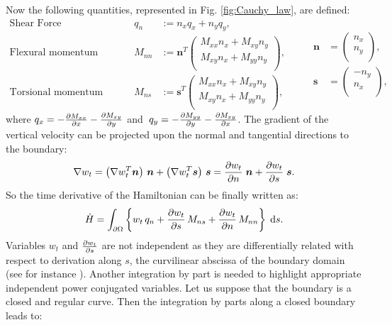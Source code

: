 \documentclass[preprint,12pt]{elsarticle}
\newcommand{\revOne}[1]{\textcolor{blue!80!black}{#1}}
\begin{document}
Now the following quantities, represented in Fig. \ref{fig:Cauchy_law}, are defined: 
\begin{equation}
\label{eq:QnMnnMns}
\begin{aligned}
\text{Shear Force}& \; \; \quad &q_{n} &:= n_x q_x + n_y q_y,   \\
\text{Flexural momentum}& \quad 
&M_{nn} &:= \bm{n}^T	
\begin{pmatrix}
M_{xx} n_x + M_{xy} n_y \\
M_{xy} n_x + M_{yy} n_y \\
\end{pmatrix}, \\
\text{Torsional momentum}& \quad &M_{ns} &:= \bm{s}^T	
\begin{pmatrix}
M_{xx} n_x + M_{xy} n_y \\
M_{xy} n_x + M_{yy} n_y \\
\end{pmatrix}, 
\end{aligned} \qquad
\begin{aligned}
\bm{n} &= 
\begin{pmatrix}
n_x \\
n_y \\
\end{pmatrix}, \\
\bm{s} &= 
\begin{pmatrix}
-n_y \\
n_x \\
\end{pmatrix},
\end{aligned}
\end{equation}
where $q_x = - \diffp{M_{xx}}{x} -\diffp{M_{xy}}{y}$ and $\; q_y = - \diffp{M_{yy}}{y} -\diffp{M_{xy}}{x}$. The gradient of the vertical velocity can be projected upon the normal and tangential directions to the boundary:
\begin{equation}
\label{eq:gr_dec_ns}
\nabla w_t = \left(\nabla w_t^T \bm{n} \right) \,\bm{n} + \left(\nabla w_t^T \bm{s} \right) \, \bm{s} = \diffp{w_t}{n} \; \bm{n} +   \diffp{w_t}{s} \; \bm{s}.
\end{equation}
So the time derivative of the Hamiltonian can be finally written as:
\begin{equation}
\dot{H} = \int_{\partial \Omega} \left\{ w_t \, q_n + \diffp{w_t}{s} \, M_{ns} + \diffp{w_t}{n} \, M_{nn}\right\} \d{s}.
\end{equation}
\revOne{Variables $w_t$ and $\diffp{w_t}{s}$ are not independent as they are differentially related with respect to derivation along $s$, the curvilinear abscissa of the boundary domain (see for instance \cite{timoshenko1959theory})}. Another integration by part is needed to highlight appropriate \revOne{independent} power conjugated variables. Let us suppose that the boundary is a closed and regular curve. Then the integration by parts along a closed boundary leads to:
\end{document}
